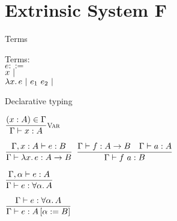 \documentclass{beamer}
\begin{document}
\section{Extrinsic System F}

\begin{frame}{Terms}

Terms: \\
$e ::=$ \\
\qquad $x \pipe $ \\
\qquad $\fun{x}{e} \pipe \app{e_1}{e_2} \pipe$

\end{frame}

\begin{frame}{Declarative typing}

\begin{center}
  $\infrule[Var]{\sidecond{(x : A) \in \Gamma}}{\typing{x}{A}}$

  \vspace{2em}

  $\infrule{\fulltyping{\extend{\Gamma}{x}{A}}{e}{B}}{\typing{\fun{x}{e}}{\Fun{A}{B}}}$ \quad
  $\infrule{\typing{f}{\Fun{A}{B}} \quad \typing{a}{A}}{\typing{\app{f}{a}}{B}}$

  \vspace{2em}

  $\infrule{\fulltyping{\extendtype{\Gamma}{\alpha}}{e}{A}}{\typing{e}{\ForallT{\alpha}{A}}}$

  \vspace{2em}

  $\infrule{\typing{e}{\ForallT{\alpha}{A}}}{\typing{e}{\subst{A}{\alpha}{B}}}$
\end{center}

\end{frame}
\end{document}
